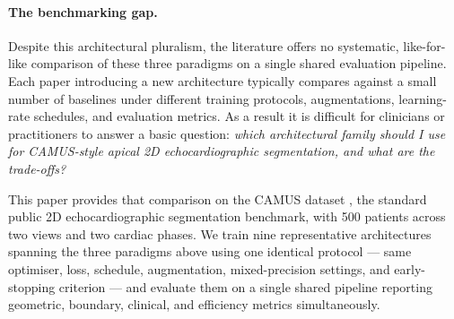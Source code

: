 \paragraph{The benchmarking gap.}
Despite this architectural pluralism, the literature offers no
systematic, like-for-like comparison of these three paradigms on a single
shared evaluation pipeline. Each paper introducing a new architecture
typically compares against a small number of baselines under different
training protocols, augmentations, learning-rate schedules, and
evaluation metrics. As a result it is difficult for clinicians or
practitioners to answer a basic question: \emph{which architectural
family should I use for CAMUS-style apical 2D echocardiographic
segmentation, and what are the trade-offs?}

This paper provides that comparison on the CAMUS dataset
\citep{leclerc2019}, the standard public 2D echocardiographic
segmentation benchmark, with 500 patients across two views and two
cardiac phases. We train nine representative architectures spanning the
three paradigms above using one identical protocol --- same optimiser,
loss, schedule, augmentation, mixed-precision settings, and early-stopping
criterion --- and evaluate them on a single shared pipeline reporting
geometric, boundary, clinical, and efficiency metrics simultaneously.

